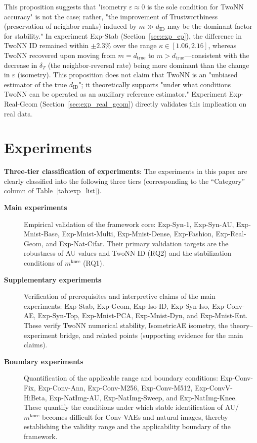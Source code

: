 \documentclass[make,article,submit,pdftex,moreauthors]{Definitions/mdpi}
\newcommand{\kap}{\kappa}
\newcommand{\mknee}{m^{\mathrm{knee}}}
\begin{document}
\begin{Remark}
This proposition suggests that "isometry $\varepsilon \approx 0$ is the sole condition
for TwoNN accuracy" is not the case; rather, "the improvement of Trustworthiness
(preservation of neighbor ranks) induced by $m \gg d_\mathrm{ID}$ may be the dominant
factor for stability."
In experiment Exp-Stab (Section~\ref{sec:exp_ep}), the difference in TwoNN ID remained
within $\pm 2.3\%$ over the range $\kap \in [1.06, 2.16]$, whereas TwoNN recovered upon
moving from $m = d_\mathrm{true}$ to $m > d_\mathrm{true}$---consistent with the
decrease in $\delta_T$ (the neighbor-reversal rate) being more dominant than the change
in $\varepsilon$ (isometry).
This proposition does not claim that TwoNN is an "unbiased estimator of the true
$d_\mathrm{ID}$"; it theoretically supports "under what conditions TwoNN can be operated
as an auxiliary reference estimator."
Experiment Exp-Real-Geom (Section~\ref{sec:exp_real_geom}) directly validates this
implication on real data.
\end{Remark}

\section{Experiments}\label{sec:exp}

\textbf{Three-tier classification of experiments}:
The experiments in this paper are clearly classified into the following three tiers
(corresponding to the ``Category'' column of Table~\ref{tab:exp_list}).
\begin{description}
  \item[\textbf{Main experiments}]
        Empirical validation of the framework core:
        Exp-Syn-1, Exp-Syn-AU, Exp-Mnist-Base, Exp-Mnist-Multi, Exp-Mnist-Dense, Exp-Fashion, Exp-Real-Geom, and Exp-Nat-Cifar.
        Their primary validation targets are the robustness of AU values and TwoNN ID (RQ2) and the stabilization conditions of $\mknee$ (RQ1).
  \item[\textbf{Supplementary experiments}]
        Verification of prerequisites and interpretive claims of the main experiments:
        Exp-Stab, Exp-Geom, Exp-Iso-ID, Exp-Syn-Iso, Exp-Conv-AE, Exp-Syn-Top, Exp-Mnist-PCA, Exp-Mnist-Dyn, and Exp-Mnist-Ent.
        These verify TwoNN numerical stability, IsometricAE isometry, the theory--experiment bridge, and related points (supporting evidence for the main claims).
  \item[\textbf{Boundary experiments}]
        Quantification of the applicable range and boundary conditions:
        Exp-Conv-Fix, Exp-Conv-Ann, Exp-Conv-M256, Exp-Conv-M512, Exp-ConvV-HiBeta, Exp-NatImg-AU, Exp-NatImg-Sweep, and Exp-NatImg-Knee.
        These quantify the conditions under which stable identification of AU/$\mknee$ becomes difficult for Conv-VAEs and natural images,
        thereby establishing the validity range and the applicability boundary of the framework.
\end{description}
\end{document}
